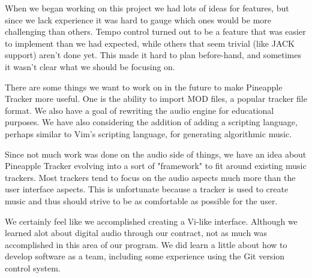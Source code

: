 \documentclass[12pt,letterpaper]{article}
\begin{document}
\par
When we began working on this project we had lots of ideas for features, but since we lack experience it was hard to gauge which ones would be more challenging than others. Tempo control turned out to be a feature that was easier to implement than we had expected, while others that seem trivial (like JACK support) aren't done yet. This made it hard to plan before-hand, and sometimes it wasn't clear what we should be focusing on.

\par
There are some things we want to work on in the future to make Pineapple Tracker more useful. One is the ability to import MOD files, a popular tracker file format. We also have a goal of rewriting the audio engine for educational purposes. We have also considering the addition of adding a scripting language, perhaps similar to Vim's scripting language, for generating algorithmic music.

\par
Since not much work was done on the audio side of things, we have an idea about Pineapple Tracker evolving into a sort of "framework" to fit around existing music trackers. Most trackers tend to focus on the audio aspects much more than the user interface aspects. This is unfortunate because a tracker is used to create music and thus should strive to be as comfortable as possible for the user.

\par
We certainly feel like we accomplished creating a Vi-like interface. Although we learned alot about digital audio through our contract, not as much was accomplished in this area of our program. We did learn a little about how to develop software as a team, including some experience using the Git version control system.
\end{document}
